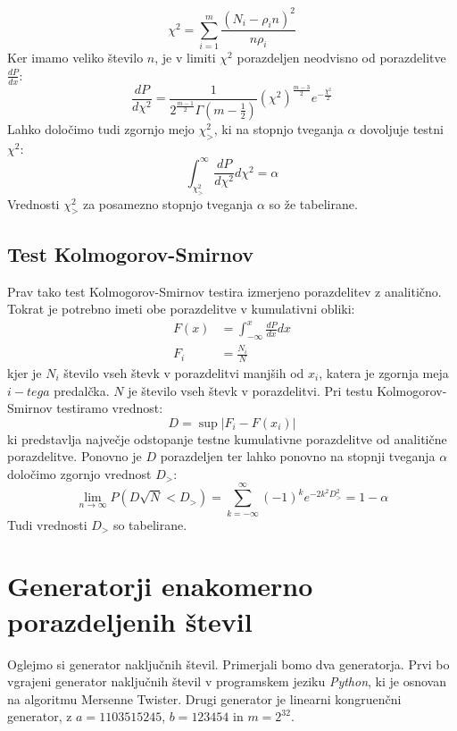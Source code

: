\documentclass[slovene,11pt,a4paper]{article}
\numberwithin{equation}{section} %
\numberwithin{figure}{section} %
\numberwithin{table}{section} %
\begin{document}
\begin{equation}
\chi^2 =\sum_{i=1}^m  \frac{ ( N_i - \rho_i n)^2 }{ n \rho_i } 
\end{equation}
Ker imamo veliko število $n$, je v limiti $\chi^2$ porazdeljen neodvisno od porazdelitve $\frac{dP}{dx}$:
\begin{equation}
\frac{d P}{d \chi^2}= \frac{1}{2^{\frac{m-1}{2}} \Gamma(m-\frac{1}{2})} (\chi^2)^{\frac{m-3}{2}} e^{-\frac{\chi^2}{2}}
\end{equation}	
Lahko določimo tudi zgornjo mejo $\chi^2_>$, ki na stopnjo tveganja $\alpha$ dovoljuje testni $\chi^2$:
\begin{equation}
\label{enacba-chi}
\int_{\chi^2_>}^{\infty} \frac{d P}{d \chi^2} d\chi^2 = \alpha
\end{equation}
Vrednosti $\chi^2_>$ za posamezno stopnjo tveganja $\alpha$ so že tabelirane.

\subsection{Test Kolmogorov-Smirnov}
Prav tako test Kolmogorov-Smirnov testira izmerjeno porazdelitev z analitično. Tokrat je potrebno imeti obe porazdelitve v kumulativni obliki:
\begin{equation}
\begin{aligned}
F(x)&=\int_{- \infty}^{x} \frac{d P}{d x} dx \\
F_i&=\frac{N_i}{N}
\end{aligned}
\end{equation}
kjer je $N_i$ število vseh števk v porazdelitvi manjših od $x_i$, katera je zgornja meja $i-tega$ predalčka. $N$ je število vseh števk v porazdelitvi. Pri testu Kolmogorov-Smirnov testiramo vrednost:
\begin{equation}
D=\sup|F_i-F(x_i)|
\end{equation}
ki predstavlja največje odstopanje testne kumulativne porazdelitve od analitične porazdelitve. 
Ponovno je $D$ porazdeljen ter lahko ponovno na stopnji tveganja $\alpha$ določimo zgornjo vrednost $D_>$:
\begin{equation}
\label{enacba-ks}
\lim_{n \rightarrow \infty} P(D \sqrt{N} < D_>) = \sum_{k=-\infty}^{\infty}(-1)^{k}e^{-2k^{2}D_>^{2}}=1-\alpha
\end{equation}
Tudi vrednosti $D_>$ so tabelirane.


\section{Generatorji enakomerno porazdeljenih števil}
Oglejmo si generator naključnih števil. Primerjali bomo dva generatorja. Prvi bo vgrajeni generator naključnih števil v programskem jeziku \textit{Python}, ki je osnovan na algoritmu Mersenne Twister. Drugi generator je linearni kongruenčni generator, z $a=1103515245$, $b=123454$ in $m=2^{32}$.
\end{document}
